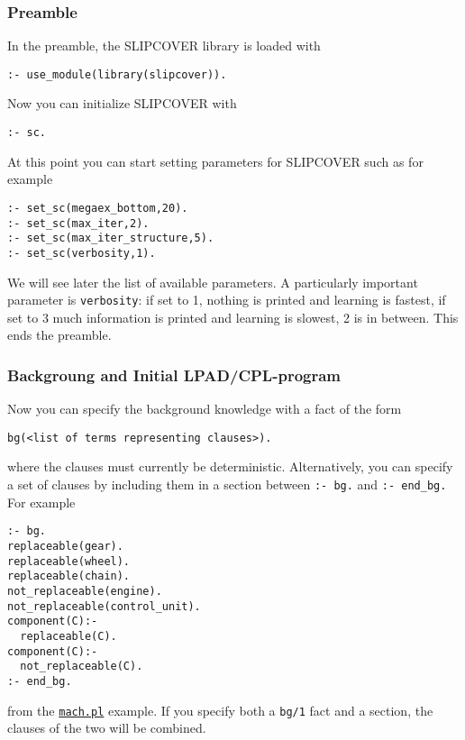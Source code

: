 \subsubsection{Preamble}
In the preamble, the SLIPCOVER library is loaded with
\begin{verbatim}
:- use_module(library(slipcover)).
\end{verbatim}
Now you can initialize SLIPCOVER with
\begin{verbatim}
:- sc.
\end{verbatim}
At this point you can start setting parameters for SLIPCOVER such as for example
\begin{verbatim}
:- set_sc(megaex_bottom,20).
:- set_sc(max_iter,2).
:- set_sc(max_iter_structure,5).
:- set_sc(verbosity,1).
\end{verbatim}
We will see later the list of available parameters.
A particularly important parameter is \verb|verbosity|: if set
to 1, nothing is printed and learning is  fastest, if set to 3 much information is printed and learning is slowest, 2 is in between.
This ends the preamble.

\subsubsection{Backgroung and Initial LPAD/CPL-program}
%
Now you can specify the background knowledge with a 
fact of the form 
\begin{verbatim}
bg(<list of terms representing clauses>).
\end{verbatim}
where the clauses must currently be deterministic.
Alternatively, you can specify a set of clauses by including them in 
a section between
\verb|:- bg.| and \verb|:- end_bg.| For example
\begin{verbatim}
:- bg.
replaceable(gear).
replaceable(wheel).
replaceable(chain).
not_replaceable(engine).
not_replaceable(control_unit).
component(C):-
  replaceable(C).
component(C):-
  not_replaceable(C).
:- end_bg.
\end{verbatim}
from the \href{http://cplint.lamping.unife.it/example/mach.pl}{\texttt{mach.pl}} example.
If you specify both a \verb|bg/1| fact and a section, the clauses of the two will be combined.



